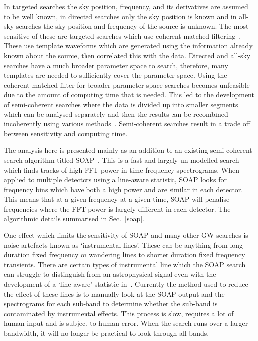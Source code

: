 %
In targeted searches the sky position, frequency, and its derivatives are
assumed to be well known, in directed searches only the sky position is
known and in all-sky searches the sky position and frequency of the source is unknown.
The most sensitive of these are targeted searches which use coherent matched
filtering~\cite{dupuis2005BayesianEstimation,schutz1998DataAnalysis}. These use
template waveforms which are generated using the information already known about the
source, then correlated this with the data. Directed and all-sky searches have
a much broader parameter space to search, therefore, many templates are needed
to sufficiently cover the parameter space. Using the coherent matched filter
for broader parameter space searches becomes unfeasible due to the amount of
computing time that is needed. This led to the development of semi-coherent
searches where the data is divided up into smaller segments which can be analysed
separately and then the results can be recombined incoherently using various
methods~\cite{abbott2019AllskySearch,creighton2000SearchingPeriodic}. Semi-coherent
searches result in a trade off between sensitivity and computing time.

%
The analysis here is presented mainly as an addition to an existing
semi-coherent search algorithm titled SOAP~\cite{bayley2019SOAPGeneralised}.
This is a fast and largely un-modelled search which finds tracks of
high \gls{FFT} power in time-frequency spectrograms. 
When applied to multiple detectors using a line-aware statistic, SOAP looks for frequency bins which have both a high power and are similar in each detector. 
This means that  at a given frequency at a given time, SOAP will penalise frequencies where the \gls{FFT} power is largely different in each detector.  
The algorithmic details summarised in Sec.~\ref{soap}. 

%

One effect which limits the sensitivity of SOAP and many other
\gls{GW} searches is noise artefacts known as `instrumental lines'. These can be anything
from long duration fixed frequency or wandering lines to shorter duration fixed frequency transients. 
There are certain types of instrumental line which the SOAP search can struggle to distinguish from an astrophysical signal even with the development of a
`line aware' statistic in~\cite{bayley2019SOAPGeneralised}. Currently the
method used to reduce the effect of these lines is to manually look at the SOAP
output and the spectrograms for each sub-band to determine whether the sub-band
is contaminated by instrumental effects. This process is slow, requires a
lot of human input and is subject to human error. When the search runs over
a larger bandwidth, it will no longer be practical to look
through all bands. 


